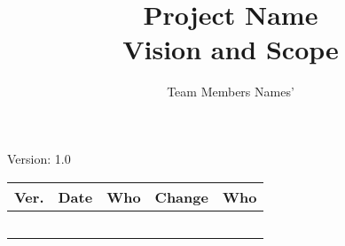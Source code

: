 \documentclass[letterpaper,12pt]{article}
\title{Project Name\\Vision and Scope}
\author{Team Members Names'}
\begin{document}
\maketitle

\begin{center}
  Version: 1.0
\end{center}

\vfill
\begin{tabularx}{\linewidth}{|l|l|l|X|l|}\hline
Ver. & Date & Who & Change & Who \\\hline
     &      &     &        &     \\\hline
     &      &     &        &     \\\hline
     &      &     &        &     \\\hline
     &      &     &        &     \\\hline
     &      &     &        &     \\\hline
\end{tabularx}
\newpage






\end{document}
